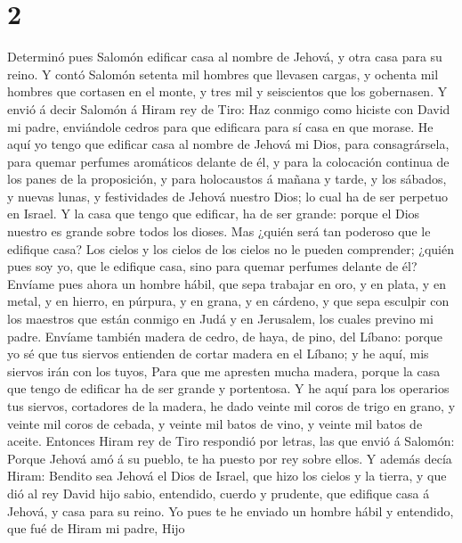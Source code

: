 \hypertarget{section-1}{%
\section{2}\label{section-1}}

 Determinó pues Salomón edificar casa al nombre de Jehová, y
otra casa para su reino.  Y contó Salomón setenta mil
hombres que llevasen cargas, y ochenta mil hombres que cortasen en el
monte, y tres mil y seiscientos que los gobernasen.  Y envió
á decir Salomón á Hiram rey de Tiro: Haz conmigo como hiciste con David
mi padre, enviándole cedros para que edificara para sí casa en que
morase.  He aquí yo tengo que edificar casa al nombre de
Jehová mi Dios, para consagrársela, para quemar perfumes aromáticos
delante de él, y para la colocación continua de los panes de la
proposición, y para holocaustos á mañana y tarde, y los sábados, y
nuevas lunas, y festividades de Jehová nuestro Dios; lo cual ha de ser
perpetuo en Israel.  Y la casa que tengo que edificar, ha de
ser grande: porque el Dios nuestro es grande sobre todos los dioses.
 Mas ¿quién será tan poderoso que le edifique casa? Los
cielos y los cielos de los cielos no le pueden comprender; ¿quién pues
soy yo, que le edifique casa, sino para quemar perfumes delante de él?
 Envíame pues ahora un hombre hábil, que sepa trabajar en
oro, y en plata, y en metal, y en hierro, en púrpura, y en grana, y en
cárdeno, y que sepa esculpir con los maestros que están conmigo en Judá
y en Jerusalem, los cuales previno mi padre.  Envíame
también madera de cedro, de haya, de pino, del Líbano: porque yo sé que
tus siervos entienden de cortar madera en el Líbano; y he aquí, mis
siervos irán con los tuyos,  Para que me apresten mucha
madera, porque la casa que tengo de edificar ha de ser grande y
portentosa.  Y he aquí para los operarios tus siervos,
cortadores de la madera, he dado veinte mil coros de trigo en grano, y
veinte mil coros de cebada, y veinte mil batos de vino, y veinte mil
batos de aceite.  Entonces Hiram rey de Tiro respondió por
letras, las que envió á Salomón: Porque Jehová amó á su pueblo, te ha
puesto por rey sobre ellos.  Y además decía Hiram: Bendito
sea Jehová el Dios de Israel, que hizo los cielos y la tierra, y que dió
al rey David hijo sabio, entendido, cuerdo y prudente, que edifique casa
á Jehová, y casa para su reino.  Yo pues te he enviado un
hombre hábil y entendido, que fué de Hiram mi padre,  Hijo
